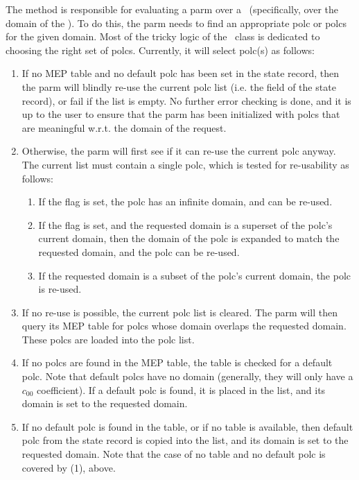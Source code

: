   The  method is responsible for evaluating a parm over a
  \Cells\ (specifically, over the domain of the \Cells). To do this, the parm
  needs to find an appropriate polc or polcs for the given domain. Most of the
  tricky logic of the \Parm\ class is dedicated to choosing the right set of
  polcs.  Currently, it will select polc(s) as follows:

  \begin{enumerate}
  
  \item If no MEP table and no default polc has been set in the state record,
    then the parm will blindly re-use the current polc list (i.e. the
     field of the state record), or fail if the list is empty.  No
    further error checking is done, and it is up to the user to ensure that the
    parm has been initialized with polcs that are meaningful w.r.t. the domain
    of the request.

  \item Otherwise, the parm will first see if it can re-use the current polc 
    anyway. The current list must contain a single polc, which is tested for
    re-usability as follows:

    \begin{enumerate}
    
    \item If the  flag is set, the polc has an infinite domain, 
      and can be re-used.
      
    \item If the  flag is set, and the requested domain is a
      superset of the polc's current domain, then the domain of the polc is
      expanded to match the requested domain, and the polc can be re-used. 

    \item If the requested domain is a subset of the polc's current domain, the
      polc is re-used.

    \end{enumerate}

  \item If no re-use is possible, the current polc list is cleared. The parm
    will then query its MEP table for polcs whose domain overlaps the requested
    domain. These polcs are loaded into the polc list.

  \item If no polcs are found in the MEP table, the table is checked for a
    default polc. Note that default polcs have no domain (generally, they will
    only have a $c_{00}$ coefficient). If a default polc is found, it is placed
    in the list, and its domain is set to the requested domain.

  \item If no default polc is found in the table, or if no table is available,
    then default polc from the state record is copied into the list, and its
    domain is set to the requested domain. Note that the case of no table and
    no default polc is covered by (1), above.

  \end{enumerate}
  
